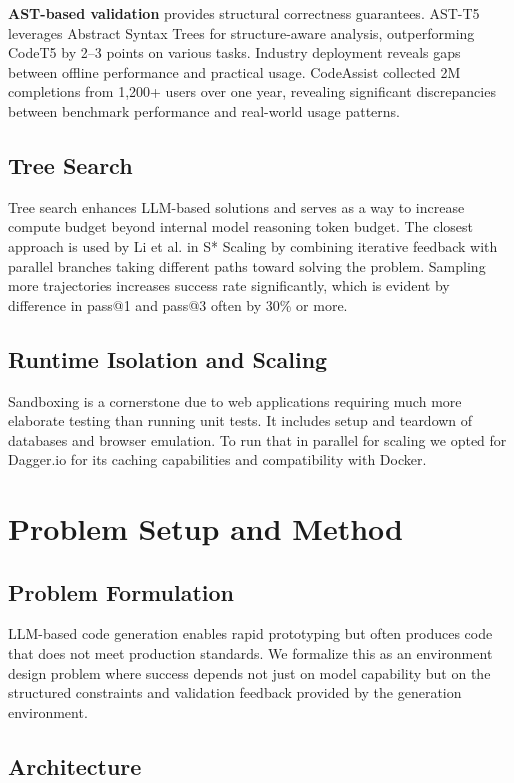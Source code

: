 \documentclass{article}
\begin{document}
\textbf{AST-based validation} provides structural correctness guarantees. AST-T5 leverages Abstract Syntax Trees for structure-aware analysis, outperforming CodeT5 by 2--3 points on various tasks. Industry deployment reveals gaps between offline performance and practical usage. CodeAssist collected 2M completions from 1,200+ users over one year, revealing significant discrepancies between benchmark performance and real-world usage patterns.

\subsection{Tree Search}

Tree search enhances LLM-based solutions and serves as a way to increase compute budget beyond internal model reasoning token budget. The closest approach is used by Li et al. in S* Scaling \citep{li2025s} by combining iterative feedback with parallel branches taking different paths toward solving the problem. Sampling more trajectories increases success rate significantly, which is evident by difference in pass@1 and pass@3 often by 30\% or more.

\subsection{Runtime Isolation and Scaling}
Sandboxing is a cornerstone due to web applications requiring much more elaborate testing than running unit tests. It includes setup and teardown of databases and browser emulation. To run that in parallel for scaling we opted for Dagger.io for its caching capabilities and compatibility with Docker.

\section{Problem Setup and Method}

\subsection{Problem Formulation}

LLM-based code generation enables rapid prototyping but often produces code that does not meet production standards. We formalize this as an environment design problem where success depends not just on model capability but on the structured constraints and validation feedback provided by the generation environment.

\subsection{Architecture}
\end{document}
